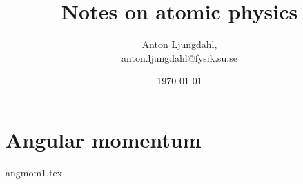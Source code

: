 \documentclass[12pt,a4paper]{article}
\numberwithin{equation}{section}
\begin{document}
\author{Anton Ljungdahl, \\
\small{anton.ljungdahl@fysik.su.se}}
\title{Notes on atomic physics}
\date{\today}
\maketitle
\tableofcontents

\section{Angular momentum}
{angmom1.tex}
\end{document}
